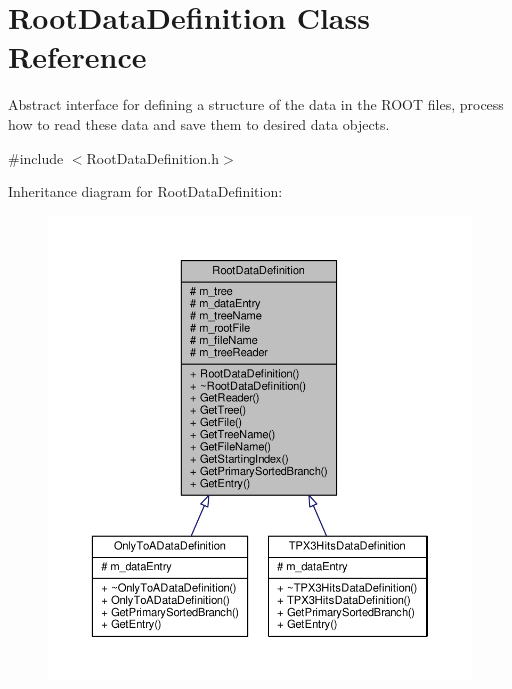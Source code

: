 \hypertarget{classRootDataDefinition}{\section{Root\+Data\+Definition Class Reference}
\label{classRootDataDefinition}
}


Abstract interface for defining a structure of the data in the R\+O\+O\+T files, process how to read these data and save them to desired data objects.  




{\ttfamily \#include $<$Root\+Data\+Definition.\+h$>$}



Inheritance diagram for Root\+Data\+Definition\+:\nopagebreak
\begin{figure}[H]
\begin{center}
\leavevmode
\includegraphics[width=350pt]{classRootDataDefinition__inherit__graph}
\end{center}
\end{figure}


